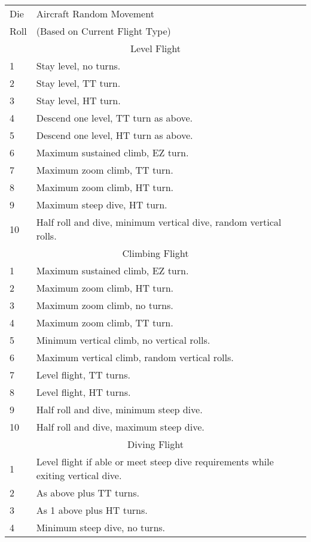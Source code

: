 \begin{TABLE}


\small
\begin{tabularx}{\linewidth}{lX}
\hline
Die&Aircraft Random Movement\\
Roll&(Based on Current Flight Type)\\
\hline
\multicolumn{2}{c}{Level Flight}\\
\hline
1   &Stay level, no turns.\\
2   &Stay level, TT turn.\\
3   &Stay level, HT turn.\\
4   &Descend one level, TT turn as above.\\
5   &Descend one level, HT turn as above.\\
6   &Maximum sustained climb, EZ turn.\\
7   &Maximum zoom climb, TT turn.\\
8   &Maximum zoom climb, HT turn.\\
9   &Maximum steep dive, HT turn.\\
10  &Half roll and dive, minimum vertical dive, random vertical rolls.\\
\hline
\multicolumn{2}{c}{Climbing Flight}\\
\hline
1   &Maximum sustained climb, EZ turn.\\
2   &Maximum zoom climb, HT turn.\\
3   &Maximum zoom climb, no turns.\\
4   &Maximum zoom climb, TT turn.\\
5   &Minimum vertical climb, no vertical rolls.\\
6   &Maximum vertical climb, random vertical rolls.\\
7   &Level flight, TT turns.\\
8   &Level flight, HT turns.\\
9   &Half roll and dive, minimum steep dive.\\
10  &Half roll and dive, maximum steep dive.\\
\hline
\multicolumn{2}{c}{Diving Flight}\\
\hline
1   &Level flight if able or meet steep dive requirements while exiting vertical dive.\\
2   &As above plus TT turns.\\
3   &As 1 above plus HT turns.\\
4   &Minimum steep dive, no turns.\\

\end{tabularx}
\end{TABLE}
